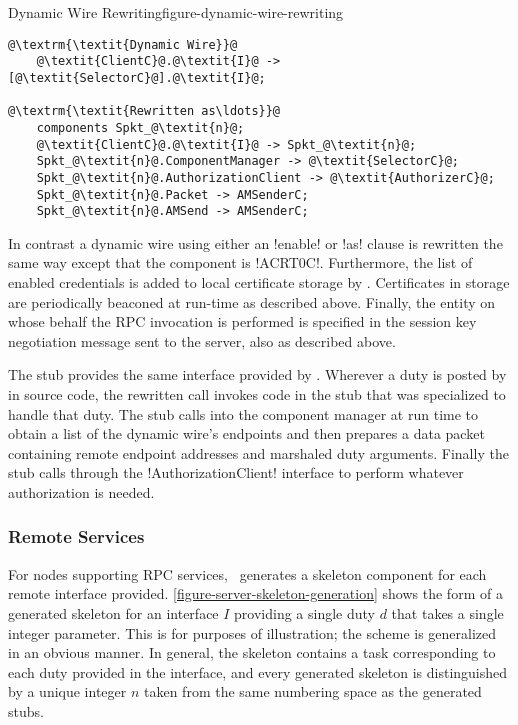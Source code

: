 \begin{fpfig}[t]{Dynamic Wire Rewriting}{figure-dynamic-wire-rewriting}
{
\singlespace
\begin{lstlisting}[escapechar=@]
@\textrm{\textit{Dynamic Wire}}@
    @\textit{ClientC}@.@\textit{I}@ -> [@\textit{SelectorC}@].@\textit{I}@;

@\textrm{\textit{Rewritten as\ldots}}@
    components Spkt_@\textit{n}@;
    @\textit{ClientC}@.@\textit{I}@ -> Spkt_@\textit{n}@;
    Spkt_@\textit{n}@.ComponentManager -> @\textit{SelectorC}@;
    Spkt_@\textit{n}@.AuthorizationClient -> @\textit{AuthorizerC}@;
    Spkt_@\textit{n}@.Packet -> AMSenderC;
    Spkt_@\textit{n}@.AMSend -> AMSenderC;
\end{lstlisting}
\primaryspacing
}
\end{fpfig}

In contrast a dynamic wire using either an !enable! or !as! clause is rewritten the same way
except that the  component is !ACRT0C!. Furthermore, the list of
enabled credentials is added to local certificate storage by \Sprocket. Certificates in storage
are periodically beaconed at run-time as described above. Finally, the entity on whose behalf
the RPC invocation is performed is specified in the session key negotiation message sent to the
server, also as described above.

The  stub provides the same interface provided by
. Wherever a duty is posted by  in source code,
the rewritten call invokes code in the stub that was specialized to handle that duty. The stub
calls into the component manager at run time to obtain a list of the dynamic wire's endpoints
and then prepares a data packet containing remote endpoint addresses and marshaled duty
arguments. Finally the stub calls through the !AuthorizationClient! interface to perform
whatever authorization is needed.

\subsubsection{Remote Services}

For nodes supporting RPC services, \Sprocket\ generates a skeleton component for each remote
interface provided. \autoref{figure-server-skeleton-generation} shows the form of a generated
skeleton for an interface $I$ providing a single duty $d$ that takes a single integer parameter.
This is for purposes of illustration; the scheme is generalized in an obvious manner. In
general, the skeleton contains a task corresponding to each duty provided in the interface, and
every generated skeleton is distinguished by a unique integer $n$ taken from the same numbering
space as the generated stubs.


